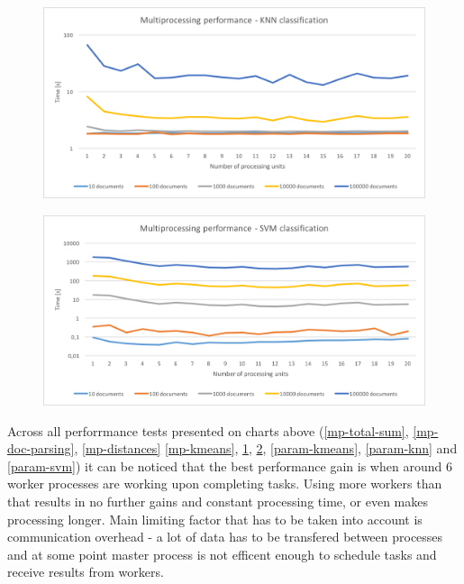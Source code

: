   \begin{figure}
\begin{center}
 \includegraphics[width=0.9\linewidth]{images/tests/mp-knn.png}
 \caption{ }
 \label{mp-knn}
 \end{center}
 \end{figure}

\begin{figure}
\begin{center}
\includegraphics[width=0.9\linewidth]{images/tests/mp-svm.png}
\caption{ }
\label{mp-svm}
\end{center}
\end{figure}

Across all perforrmance tests presented on charts above (\ref{mp-total-sum}, \ref{mp-doc-parsing}, \ref{mp-distances} \ref{mp-kmeans}, \ref{mp-knn}, \ref{mp-svm}, \ref{param-kmeans}, \ref{param-knn} and \ref{param-svm}) it can be noticed that the best performance gain is when around 6 worker processes are working upon completing tasks. Using more workers than that results in no further gains and constant processing time, or even makes processing longer. Main limiting factor that has to be taken into account is communication overhead - a lot of data has to be transfered between processes and at some point master process is not efficent enough to schedule tasks and receive results from workers.

